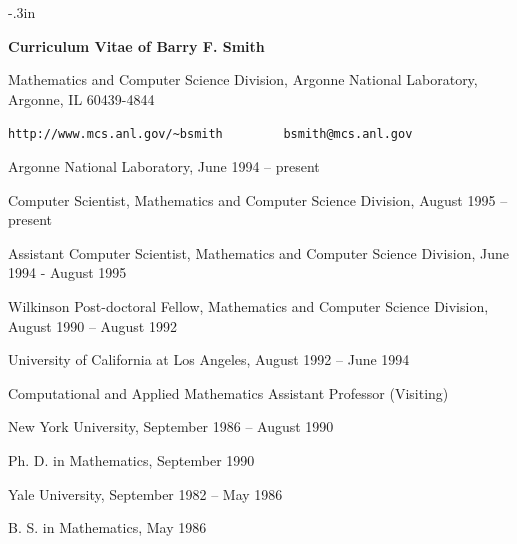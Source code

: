 
\newcommand{\itemskip}{\vspace*{12pt}}
\newcommand{\tinyskip}{\vspace*{2pt}}

\topmargin-.3in
\textwidth6.25in
\thispagestyle{empty}


{\large
\centerline{\large\bf Curriculum Vitae of Barry F. Smith}
}
\centerline{Mathematics and Computer Science Division, Argonne National Laboratory,
Argonne, IL 60439-4844}
\centerline{{\tt http://www.mcs.anl.gov/\~{ }bsmith} \ \ \ \ \ \ \ \ 
{\tt bsmith@mcs.anl.gov}}

\itemskip
{}
\begin{description}
\item Argonne National Laboratory, June 1994 -- present
\begin{description}
  \item Computer Scientist, Mathematics and Computer Science Division, August 1995 -- present
  \item Assistant Computer Scientist, Mathematics and Computer Science Division, 
        June 1994 - August 1995
  \item Wilkinson Post-doctoral Fellow, Mathematics and Computer Science Division, August
        1990 -- August 1992
\end{description}
\item University of California at Los Angeles, August 1992 -- June 1994
\begin{description}
  \item Computational and Applied Mathematics Assistant Professor (Visiting)
\end{description}
\end{description}


\itemskip
{}
\begin{description}
\item
New York University, September 1986 -- August 1990
\begin{description}
\item
Ph. D. in Mathematics, September 1990
\end{description}
\item
Yale University, September 1982 -- May 1986
\begin{description}
\item
B. S.  in Mathematics, May 1986
\end{description}
\end{description}



